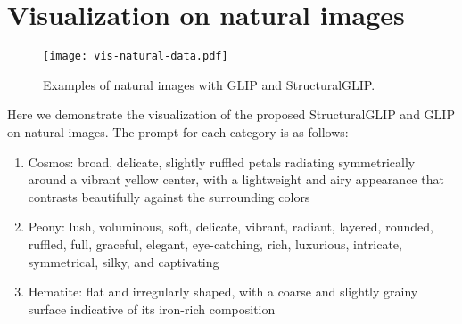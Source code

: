 \section{Visualization on natural images}
\begin{figure}[ht]
  \centering
  \texttt{[image: vis-natural-data.pdf]}
  \caption{Examples of natural images with GLIP and StructuralGLIP.}
  \label{fig:natural-data-vis}
\end{figure}
Here we demonstrate the visualization of the proposed StructuralGLIP and GLIP on natural images. The prompt for each category is as follows:

\begin{enumerate}
    \item {Cosmos: broad, delicate, slightly ruffled petals radiating symmetrically around a vibrant yellow center, with a lightweight and airy appearance that contrasts beautifully against the surrounding colors}
    \item {Peony: lush, voluminous, soft, delicate, vibrant, radiant, layered, rounded, ruffled, full, graceful, elegant, eye-catching, rich, luxurious, intricate, symmetrical, silky, and captivating}
    \item {Hematite: flat and irregularly shaped, with a coarse and slightly grainy surface indicative of its iron-rich composition}
\end{enumerate}

